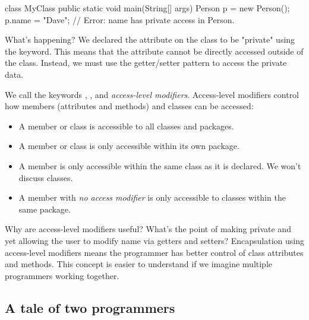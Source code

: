 \begin{code}
class MyClass {
  public static void main(String[] args) {
    Person p = new Person();
    p.name = "Dave";  // Error: name has private access in Person.
  }
}
\end{code}

What's happening? We declared the  attribute on the  class to be "private" using the  keyword. This means that the attribute cannot be directly accessed outside of the class. Instead, we must use the getter/setter pattern to access the private data.

\begin{definition}
We call the keywords , , and  \emph{access-level modifiers}. Access-level modifiers control how members (attributes and methods) and classes can be accessed:
\begin{itemize}
    \item A  member or class is accessible to all classes and packages.
    \item A  member or class is only accessible within its own package.
    \item A  member is only accessible within the same class as it is declared. We won't discuss  classes.
    \item A member with \emph{no access modifier} is only accessible to classes within the same package.
\end{itemize}
\end{definition}

Why are access-level modifiers useful? What's the point of making  private and yet allowing the user to modify name via getters and setters? Encapsulation using access-level modifiers means the programmer has better control of class attributes and methods. This concept is easier to understand if we imagine multiple programmers working together.

\subsection{A tale of two programmers}


